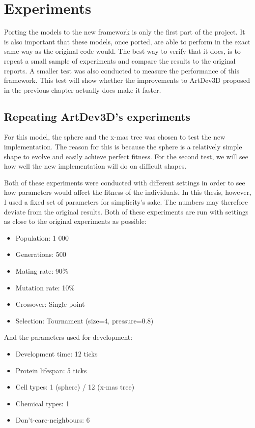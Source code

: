\section{Experiments}
\label{sec:experiments}
Porting the models to the new framework is only the first part of the project. It is also important that these models, once ported, are able to perform in the exact same way as the original code would. The best way to verify that it does, is to repeat a small sample of experiments and compare the results to the original reports. A smaller test was also conducted to measure the performance of this framework. This test will show whether the improvements to ArtDev3D proposed in the previous chapter actually does make it faster.


\subsection{Repeating ArtDev3D's experiments}
For this model, the sphere and the x-mas tree was chosen to test the new implementation. The reason for this is because the sphere is a relatively simple shape to evolve and easily achieve perfect fitness. For the second test, we will see how well the new implementation will do on difficult shapes.

Both of these experiments were conducted with different settings in order to see how parameters would affect the fitness of the individuals. In this thesis, however, I used a fixed set of parameters for simplicity's sake. The numbers may therefore deviate from the original results. Both of these experiments are run with settings as close to the original experiments as possible:

\begin{itemize}
	\itemsep=-2pt
	\item Population: 1 000
	\item Generations: 500
	\item Mating rate: 90\%
	\item Mutation rate: 10\%
	\item Crossover: Single point
	\item Selection: Tournament (size=4, pressure=0.8)
\end{itemize}

And the parameters used for development:

\begin{itemize}
	\itemsep=-2pt
	\item Development time: 12 ticks
	\item Protein lifespan: 5 ticks
	\item Cell types: 1 (sphere) / 12 (x-mas tree)
	\item Chemical types: 1
	\item Don't-care-neighbours: 6
\end{itemize}

